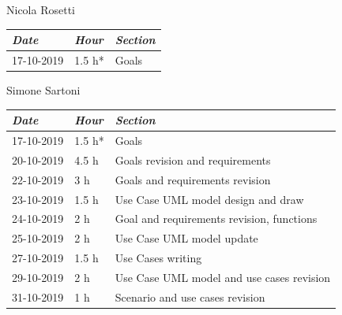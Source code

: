 \documentclass[a4paper]{report}
\begin{document}
\begin{center}
Nicola Rosetti \\
\begin{tabular}{p{2cm}p{1.5cm}p{7cm}}
\toprule
\textit{Date} & \textit{Hour} & \textit{Section} \\ \midrule
17-10-2019 & 1.5 h* & Goals \\
\bottomrule
\end{tabular}
\end{center}
\vspace*{1 cm}
\begin{center}
Simone Sartoni \\
\begin{tabular}{p{2cm}p{1.5cm}p{7cm}}
\toprule
\textit{Date} & \textit{Hour} & \textit{Section} \\ \midrule
17-10-2019 & 1.5 h* & Goals \\ \midrule
20-10-2019 & 4.5 h & Goals revision and requirements  \\ \midrule
22-10-2019 & 3 h & Goals and requirements revision \\ \midrule
23-10-2019 & 1.5 h & Use Case UML model design and draw \\ \midrule
24-10-2019 & 2 h & Goal and requirements revision, functions \\ \midrule
25-10-2019 & 2 h & Use Case UML model update \\ \midrule
27-10-2019 & 1.5 h & Use Cases writing \\ \midrule
29-10-2019 & 2 h & Use Case UML model and use cases revision \\ \midrule
31-10-2019 & 1 h & Scenario and use cases revision \\ 
\bottomrule
\end{tabular}
\end{center}
\vspace*{1 cm}
\end{document}
